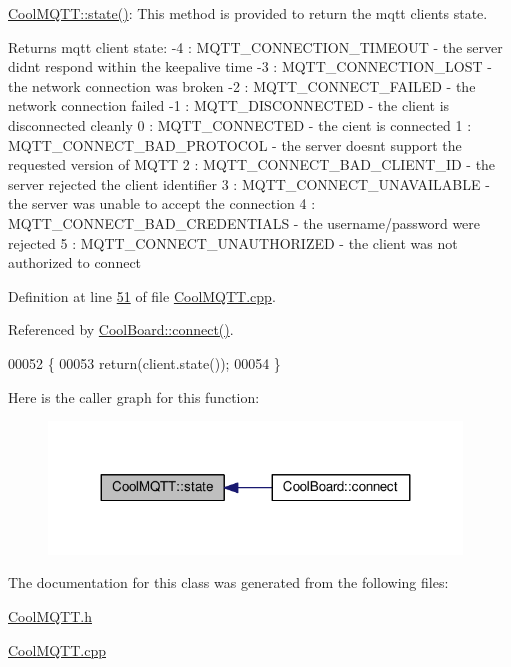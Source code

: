 \hyperlink{class_cool_m_q_t_t_a5d003307eff78efbd585e42b43b72b6d}{Cool\+M\+Q\+T\+T\+::state()}\+: This method is provided to return the mqtt client\textquotesingle{}s state. \begin{DoxyReturn}{Returns}
mqtt client state\+: -\/4 \+: M\+Q\+T\+T\+\_\+\+C\+O\+N\+N\+E\+C\+T\+I\+O\+N\+\_\+\+T\+I\+M\+E\+O\+UT -\/ the server didn\textquotesingle{}t respond within the keepalive time -\/3 \+: M\+Q\+T\+T\+\_\+\+C\+O\+N\+N\+E\+C\+T\+I\+O\+N\+\_\+\+L\+O\+ST -\/ the network connection was broken -\/2 \+: M\+Q\+T\+T\+\_\+\+C\+O\+N\+N\+E\+C\+T\+\_\+\+F\+A\+I\+L\+ED -\/ the network connection failed -\/1 \+: M\+Q\+T\+T\+\_\+\+D\+I\+S\+C\+O\+N\+N\+E\+C\+T\+ED -\/ the client is disconnected cleanly 0 \+: M\+Q\+T\+T\+\_\+\+C\+O\+N\+N\+E\+C\+T\+ED -\/ the cient is connected 1 \+: M\+Q\+T\+T\+\_\+\+C\+O\+N\+N\+E\+C\+T\+\_\+\+B\+A\+D\+\_\+\+P\+R\+O\+T\+O\+C\+OL -\/ the server doesn\textquotesingle{}t support the requested version of M\+Q\+TT 2 \+: M\+Q\+T\+T\+\_\+\+C\+O\+N\+N\+E\+C\+T\+\_\+\+B\+A\+D\+\_\+\+C\+L\+I\+E\+N\+T\+\_\+\+ID -\/ the server rejected the client identifier 3 \+: M\+Q\+T\+T\+\_\+\+C\+O\+N\+N\+E\+C\+T\+\_\+\+U\+N\+A\+V\+A\+I\+L\+A\+B\+LE -\/ the server was unable to accept the connection 4 \+: M\+Q\+T\+T\+\_\+\+C\+O\+N\+N\+E\+C\+T\+\_\+\+B\+A\+D\+\_\+\+C\+R\+E\+D\+E\+N\+T\+I\+A\+LS -\/ the username/password were rejected 5 \+: M\+Q\+T\+T\+\_\+\+C\+O\+N\+N\+E\+C\+T\+\_\+\+U\+N\+A\+U\+T\+H\+O\+R\+I\+Z\+ED -\/ the client was not authorized to connect 
\end{DoxyReturn}


Definition at line \hyperlink{_cool_m_q_t_t_8cpp_source_l00051}{51} of file \hyperlink{_cool_m_q_t_t_8cpp_source}{Cool\+M\+Q\+T\+T.\+cpp}.



Referenced by \hyperlink{_cool_board_8cpp_source_l00071}{Cool\+Board\+::connect()}.


\begin{DoxyCode}
00052 \{
00053     \textcolor{keywordflow}{return}(client.state());
00054 \}
\end{DoxyCode}
Here is the caller graph for this function\+:
\nopagebreak
\begin{figure}[H]
\begin{center}
\leavevmode
\includegraphics[width=311pt]{class_cool_m_q_t_t_a5d003307eff78efbd585e42b43b72b6d_icgraph}
\end{center}
\end{figure}


The documentation for this class was generated from the following files\+:\begin{DoxyCompactItemize}
\item 
\hyperlink{_cool_m_q_t_t_8h}{Cool\+M\+Q\+T\+T.\+h}\item 
\hyperlink{_cool_m_q_t_t_8cpp}{Cool\+M\+Q\+T\+T.\+cpp}\end{DoxyCompactItemize}
